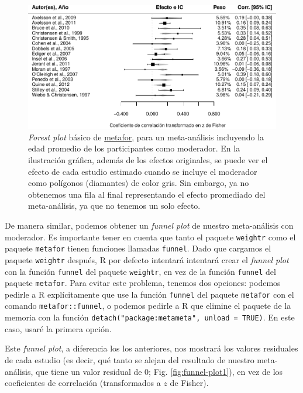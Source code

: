 \documentclass[
  bookmarksnumbered]{article}
\begin{document}
\begin{figure}
\centering
\includegraphics{Meta-analysis_files/figure-latex/for-plot-mod1-1.pdf}
\caption{\label{fig:for-plot-mod1}\emph{Forest plot} básico de \href{https://www.metafor-project.org/doku.php}{metafor}, para un meta-análisis incluyendo la edad promedio de los participantes como moderador. En la ilustración gráfica, además de los efectos originales, se puede ver el efecto de cada estudio estimado cuando se incluye el moderador como polígonos (diamantes) de color gris. Sin embargo, ya no obtenemos una fila al final representando el efecto promediado del meta-análisis, ya que no tenemos un solo efecto.}
\end{figure}

De manera similar, podemos obtener un \emph{funnel plot} de nuestro meta-análisis con moderador. Es importante tener en cuenta que tanto el paquete \texttt{weightr} como el paquete \texttt{metafor} tienen funciones llamadas \texttt{funnel}. Dado que cargamos el paquete \texttt{weightr} después, R por defecto intentará intentará crear el \emph{funnel plot} con la función \texttt{funnel} del paquete \texttt{weightr}, en vez de la función \texttt{funnel} del paquete \texttt{metafor}. Para evitar este problema, tenemos dos opciones: podemos pedirle a R explícitamente que use la función \texttt{funnel} del paquete \texttt{metafor} con el comando \texttt{metafor::funnel}, o podemos pedirle a R que elimine el paquete de la memoria con la función \texttt{detach("package:metameta",\ unload\ =\ TRUE)}. En este caso, usaré la primera opción.

Este \emph{funnel plot}, a diferencia los los anteriores, nos mostrará los valores residuales de cada estudio (es decir, qué tanto se alejan del resultado de nuestro meta-análisis, que tiene un valor residual de 0; Fig. \ref{fig:funnel-plot1}), en vez de los coeficientes de correlación (transformados a \(z\) de Fisher).
\end{document}
